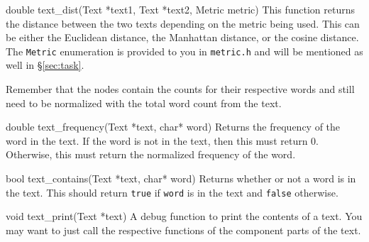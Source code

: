 \begin{funcdoc}{double text\_dist(Text *text1, Text *text2, Metric metric)}
  This function returns the distance between the two texts depending on the
  metric being used. This can be either the Euclidean distance, the Manhattan
  distance, or the cosine distance. The \texttt{Metric} enumeration is provided
  to you in \texttt{metric.h} and will be mentioned as well in \S\ref{sec:task}.

  Remember that the nodes contain the counts for their respective words and
  still need to be normalized with the total word count from the text.
\end{funcdoc}

\begin{funcdoc}{double text\_frequency(Text *text, char* word)}
  Returns the frequency of the word in the text. If the word is not in the text,
  then this must return 0. Otherwise, this must return the normalized frequency
  of the word.
\end{funcdoc}

\begin{funcdoc}{bool text\_contains(Text *text, char* word)}
  Returns whether or not a word is in the text. This should return \texttt{true}
  if \texttt{word} is in the text and \texttt{false} otherwise.
\end{funcdoc}

\begin{funcdoc}{void text\_print(Text *text)}
  A debug function to print the contents of a text. You may want to just call
  the respective functions of the component parts of the text.
\end{funcdoc}
